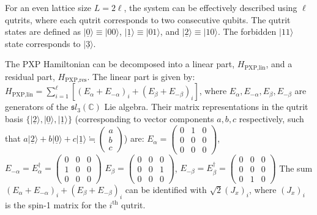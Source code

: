 \documentclass[10pt]{article}
\begin{document}
For an even lattice size $L=2\ell$, the system can be effectively described using $\ell$ qutrits, where each qutrit corresponds to two consecutive qubits. The qutrit states are defined as $|\underline{0}\rangle \equiv |00\rangle$, $|\underline{1}\rangle \equiv |01\rangle$, and $|\underline{2}\rangle \equiv |10\rangle$. The forbidden $|11\rangle$ state corresponds to $|\underline{3}\rangle$.

The PXP Hamiltonian can be decomposed into a linear part, $H_{\text{PXP,lin}}$, and a residual part, $H_{\text{PXP,res}}$. The linear part is given by:
$H_{\text{PXP,lin}} = \sum_{i=1}^{\ell} \left[ \left( E_{\alpha}+ E_{-\alpha} \right)_{i} + \left( E_{\beta}+ E_{-\beta} \right)_{i} \right]$,
where $E_{\alpha}, E_{-\alpha}, E_{\beta}, E_{-\beta}$ are generators of the $\mathfrak{s}l_3(\mathbb{C})$ Lie algebra. Their matrix representations in the qutrit basis $\{|\underline{2}\rangle, |\underline{0}\rangle, |\underline{1}\rangle\}$ (corresponding to vector components $a, b, c$ respectively, such that $a |\underline{2}\rangle+ b|\underline{0}\rangle +c |\underline{1}\rangle \fallingdotseq \begin{pmatrix} a \\ b \\ c \end{pmatrix}$) are:
$E_{\alpha} = \begin{pmatrix} 0 & 1 & 0 \\ 0 & 0 & 0 \\ 0 & 0 & 0 \end{pmatrix}$, $E_{-\alpha} = E_{\alpha}^{\dagger} = \begin{pmatrix} 0 & 0 & 0 \\ 1 & 0 & 0 \\ 0 & 0 & 0 \end{pmatrix}$
$E_{\beta} = \begin{pmatrix} 0 & 0 & 0 \\ 0 & 0 & 1 \\ 0 & 0 & 0 \end{pmatrix}$, $E_{-\beta} = E_{\beta}^{\dagger} = \begin{pmatrix} 0 & 0 & 0 \\ 0 & 0 & 0 \\ 0 & 1 & 0 \end{pmatrix}$
The sum $\left( E_{\alpha}+ E_{-\alpha} \right)_{i} + \left( E_{\beta}+ E_{-\beta} \right)_{i}$ can be identified with $\sqrt{2} (J_x)_i$, where $(J_x)_i$ is the spin-1 matrix for the $i^{\text{th}}$ qutrit.
\end{document}
